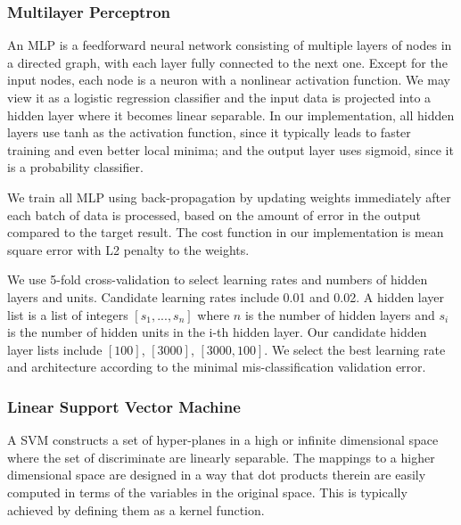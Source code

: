 \documentclass{acm_proc_article-sp}
\begin{document}
\subsubsection{Multilayer Perceptron}
An MLP is a feedforward neural network consisting of multiple layers of nodes in a directed graph, with each layer fully connected to the next one. Except for the input nodes, each node is a neuron with a nonlinear activation function. We may view it as a logistic regression classifier and the input data is projected into a hidden layer where it becomes linear separable. In our implementation, all hidden layers use tanh as the activation function, since it typically leads to faster training and even better local minima; and the output layer uses sigmoid, since it is a probability classifier.

We train all MLP using back-propagation\cite{rumelhart1986learning} by updating weights immediately after each batch of data is processed, based on the amount of error in the output compared to the target result. The cost function in our implementation is mean square error with L2 penalty to the weights.

We use 5-fold cross-validation to select learning rates and numbers of hidden layers and units. Candidate learning rates include 0.01 and 0.02. A hidden layer list is a list of integers $[s_1,...,s_n]$ where $n$ is the number of hidden layers and $s_i$ is the number of hidden units in the i-th hidden layer. Our candidate hidden layer lists include $[100]$, $[3000]$, $[3000,100]$. We select the best learning rate and architecture according to the minimal mis-classification validation error.

\subsubsection{Linear Support Vector Machine }
A SVM \cite{pineaul13} constructs a set of hyper-planes in a high or infinite dimensional space where the set of discriminate are linearly separable. The mappings to a higher dimensional space are designed in a way that dot products therein are easily computed in terms of the variables in the original space. This is typically achieved by defining them as a kernel function.
\end{document}
